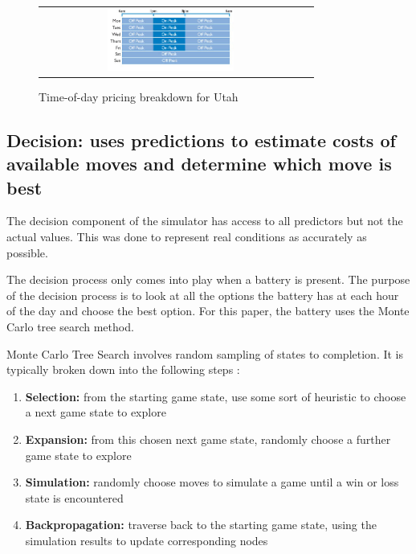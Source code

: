 \begin{figure}
 \begin{center}
  \begin{tabular}{cc}
   \includegraphics[width=0.50\textwidth]{./figures/utah_tod_pricing.png} \\
   \end{tabular}
   \end{center}
\caption{Time-of-day pricing breakdown for Utah}
  \vspace{+1mm}
\label{tod_pricing}
\end{figure}

\subsection{Decision: uses predictions to estimate costs of available moves and determine which move is best}

The decision component of the simulator has access to all predictors but not the actual values. This was done to represent real conditions as accurately as possible.

The decision process only comes into play when a battery is present. The purpose of the decision process is to look at all the options the battery has at each hour of the day and choose the best option. For this paper, the battery uses the Monte Carlo tree search method. 

Monte Carlo Tree Search involves random sampling of states to completion. It is typically broken down into the following steps \cite{noauthor_monte_2016}:

\begin{enumerate}
  \item \textbf{Selection:} from the starting game state, use some sort of heuristic to choose a next game state to explore
  \item \textbf{Expansion:} from this chosen next game state, randomly choose a further game state to explore
  \item \textbf{Simulation:} randomly choose moves to simulate a game until a win or loss state is encountered
  \item \textbf{Backpropagation:} traverse back to the starting game state, using the simulation results to update corresponding nodes
\end{enumerate}

